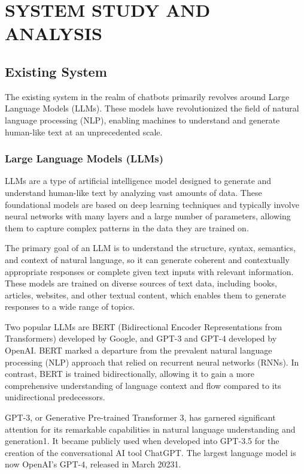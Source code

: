 \chapter{SYSTEM STUDY AND ANALYSIS}
\section{Existing System}  
The existing system in the realm of chatbots primarily revolves around Large Language Models (LLMs). These models have revolutionized the field of natural language processing (NLP), enabling machines to understand and generate human-like text at an unprecedented scale.

\subsection{Large Language Models (LLMs)}
LLMs are a type of artificial intelligence model designed to generate and understand human-like text by analyzing vast amounts of data. These foundational models are based on deep learning techniques and typically involve neural networks with many layers and a large number of parameters, allowing them to capture complex patterns in the data they are trained on.

The primary goal of an LLM is to understand the structure, syntax, semantics, and context of natural language, so it can generate coherent and contextually appropriate responses or complete given text inputs with relevant information. These models are trained on diverse sources of text data, including books, articles, websites, and other textual content, which enables them to generate responses to a wide range of topics.

Two popular LLMs are BERT (Bidirectional Encoder Representations from Transformers) developed by Google, and GPT-3 and GPT-4 developed by OpenAI\@. BERT marked a departure from the prevalent natural language processing (NLP) approach that relied on recurrent neural networks (RNNs). In contrast, BERT is trained bidirectionally, allowing it to gain a more comprehensive understanding of language context and flow compared to its unidirectional predecessors.

GPT-3, or Generative Pre-trained Transformer 3, has garnered significant attention for its remarkable capabilities in natural language understanding and generation1. It became publicly used when developed into GPT-3.5 for the creation of the conversational AI tool ChatGPT\@. The largest language model is now OpenAI's GPT-4, released in March 20231.

